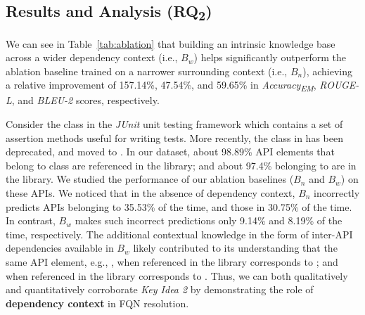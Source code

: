 \subsection*{Results and Analysis (RQ\textsubscript{2})}
\label{sec:rq2}

We can see in Table~\ref{tab:ablation} that building an intrinsic knowledge base across a wider dependency context (i.e., $B_w$) helps \tool significantly outperform the ablation baseline trained on a narrower surrounding context (i.e., $B_n$), achieving a relative improvement of 157.14\%, 47.54\%, and 59.65\% in \textit{Accuracy\textsubscript{EM}}, \textit{ROUGE-L}, and \textit{BLEU-2} scores, respectively. 

Consider the  class in the \textit{JUnit} unit testing framework which contains a set of assertion methods useful for writing tests. More recently, the  class in  has been deprecated, and moved to . In our dataset, about 98.89\% API elements that belong to  class are referenced in the  library; and about 97.4\% belonging to  are in the  library. We studied the performance of our ablation baselines ($B_n$ and $B_w$) on these APIs. We noticed that in the absence of dependency context, $B_n$ incorrectly predicts APIs belonging to  35.53\% of the time, and those in  30.75\% of the time. In contrast, $B_w$ makes such incorrect predictions only 9.14\% and 8.19\% of the time, respectively. The additional contextual knowledge in the form of inter-API dependencies available in $B_w$ likely contributed to its understanding that the same API element, e.g., , when referenced in the  library corresponds to ; and when referenced in the  library corresponds to . Thus, we can both qualitatively and quantitatively corroborate \textit{Key Idea 2} by demonstrating the role of {\bf dependency context} in FQN resolution.





